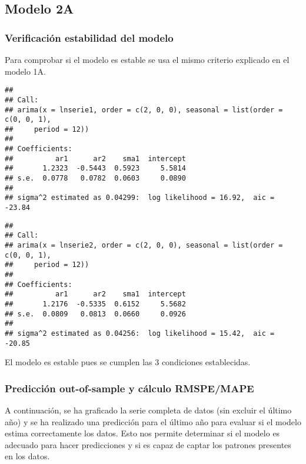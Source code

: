 \documentclass[
]{article}
\begin{document}
\medskip

\hypertarget{modelo-2a}{%
\subsection{Modelo 2A}\label{modelo-2a}}

\hypertarget{verificaciuxf3n-estabilidad-del-modelo-1}{%
\subsubsection{Verificación estabilidad del
modelo}\label{verificaciuxf3n-estabilidad-del-modelo-1}}

Para comprobar si el modelo es estable se usa el mismo criterio
explicado en el modelo 1A.

\begin{verbatim}
## 
## Call:
## arima(x = lnserie1, order = c(2, 0, 0), seasonal = list(order = c(0, 0, 1), 
##     period = 12))
## 
## Coefficients:
##          ar1      ar2    sma1  intercept
##       1.2323  -0.5443  0.5923     5.5814
## s.e.  0.0778   0.0782  0.0603     0.0890
## 
## sigma^2 estimated as 0.04299:  log likelihood = 16.92,  aic = -23.84
\end{verbatim}

\begin{verbatim}
## 
## Call:
## arima(x = lnserie2, order = c(2, 0, 0), seasonal = list(order = c(0, 0, 1), 
##     period = 12))
## 
## Coefficients:
##          ar1      ar2    sma1  intercept
##       1.2176  -0.5335  0.6152     5.5682
## s.e.  0.0809   0.0813  0.0660     0.0926
## 
## sigma^2 estimated as 0.04256:  log likelihood = 15.42,  aic = -20.85
\end{verbatim}

El modelo es estable pues se cumplen las 3 condiciones establecidas.

\hypertarget{predicciuxf3n-out-of-sample-y-cuxe1lculo-rmspemape-1}{%
\subsubsection{Predicción out-of-sample y cálculo
RMSPE/MAPE}\label{predicciuxf3n-out-of-sample-y-cuxe1lculo-rmspemape-1}}

A continuación, se ha graficado la serie completa de datos (sin excluir
el último año) y se ha realizado una predicción para el último año para
evaluar si el modelo estima correctamente los datos. Esto nos permite
determinar si el modelo es adecuado para hacer predicciones y si es
capaz de captar los patrones presentes en los datos.
\end{document}
